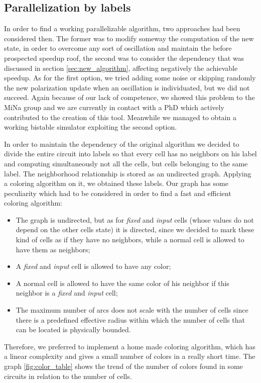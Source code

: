 \subsection{Parallelization by labels}
In order to find a working parallelizable algorithm, two approaches had been considered then. The former was to modify someway the computation of the new state, in order to overcome any sort of oscillation and maintain the before prospected speedup roof, the second was to consider the dependency that was discussed in section \ref{sec:new_algorithm}, affecting negatively the achievable speedup.
As for the first option, we tried adding some noise or skipping randomly the new polarization update when an oscillation is individuated, but we did not succeed. Again because of our lack of competence, we showed this problem to the MiNa group and we are currently in contact with a PhD which actively contributed to the creation of this tool. Meanwhile we managed to obtain a working bistable simulator exploiting the second option.\newline

In order to maintain the dependency of the original algorithm we decided to divide the entire circuit into labels so that every cell has no neighbors on his label and computing simultaneously not all the cells, but cells belonging to the same label.
The neighborhood relationship is stored as an undirected graph. Applying a coloring algorithm on it, we obtained these labels. Our graph has some peculiarity which had to be considered in order to find a fast and efficient coloring algorithm:
\begin{itemize}
	\item The graph is undirected, but as for \textit{fixed} and \textit{input} cells (whose values do not depend on the other cells state) it is directed, since we decided to mark these kind of cells as if they have no neighbors, while a normal cell is allowed to have them as neighbors;
	\item A \textit{fixed} and \textit{input} cell is allowed to have any color;
	\item A normal cell is allowed to have the same color of his neighbor if this neighbor is a \textit{fixed} and \textit{input} cell;
	\item The maximum number of arcs does not scale with the number of cells since there is a predefined effective radius within which the number of cells that can be located is physically bounded.
\end{itemize}
Therefore, we preferred to implement a home made coloring algorithm, which has a linear complexity and gives a small number of colors in a really short time. The graph \ref{fig:color_table} shows the trend of the number of colors found in some circuits in relation to the number of cells.
